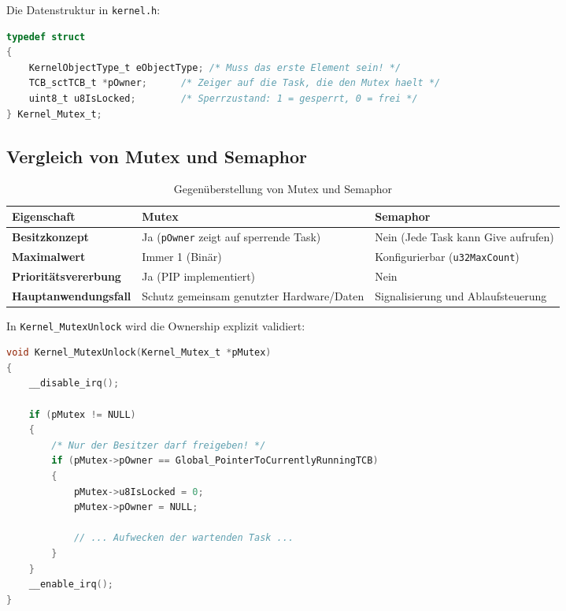 Die Datenstruktur in \lstinline|kernel.h|:
\begin{lstlisting}[language=C, caption={Struktur von Mutexes in kernel.h}, label={lst:mutex_struct}]
typedef struct
{
    KernelObjectType_t eObjectType; /* Muss das erste Element sein! */
    TCB_sctTCB_t *pOwner;      /* Zeiger auf die Task, die den Mutex haelt */
    uint8_t u8IsLocked;        /* Sperrzustand: 1 = gesperrt, 0 = frei */
} Kernel_Mutex_t;
\end{lstlisting}

\subsection{Vergleich von Mutex und Semaphor}
\begin{table}[h]
\centering
\begin{tabularx}{\textwidth}{lXX}
\toprule
\textbf{Eigenschaft} & \textbf{Mutex} & \textbf{Semaphor} \\
\midrule
\textbf{Besitzkonzept} & Ja (\lstinline|pOwner| zeigt auf sperrende Task) & Nein (Jede Task kann Give aufrufen) \\
\textbf{Maximalwert} & Immer 1 (Binär) & Konfigurierbar (\lstinline|u32MaxCount|) \\
\textbf{Prioritätsvererbung} & Ja (PIP implementiert) & Nein \\
\textbf{Hauptanwendungsfall} & Schutz gemeinsam genutzter Hardware/Daten & Signalisierung und Ablaufsteuerung \\
\bottomrule
\end{tabularx}
\caption{Gegenüberstellung von Mutex und Semaphor}
\label{tab:mutex_vs_semaphore}
\end{table}

In \lstinline|Kernel_MutexUnlock| wird die Ownership explizit validiert:
\begin{lstlisting}[language=C, caption={Auszug der Ownership-Prüfung in Kernel\_MutexUnlock}, label={lst:mutex_owner_check}]
void Kernel_MutexUnlock(Kernel_Mutex_t *pMutex)
{
    __disable_irq();

    if (pMutex != NULL)
    {
        /* Nur der Besitzer darf freigeben! */
        if (pMutex->pOwner == Global_PointerToCurrentlyRunningTCB)
        {
            pMutex->u8IsLocked = 0;
            pMutex->pOwner = NULL;
            
            // ... Aufwecken der wartenden Task ...
        }
    }
    __enable_irq();
}
\end{lstlisting}

